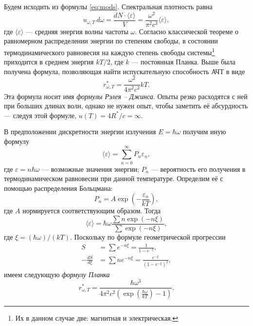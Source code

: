 Будем исходить из формулы \eqref{eq:mods}. Спектральная плотность равна
\[
  u_{\omega, T}\,d\omega = \frac{dN\cdot\langle \varepsilon \rangle}{V} =
  \frac{\omega^2}{\pi^2 c^3}\langle \varepsilon \rangle,
\]
где $ \langle \varepsilon \rangle $ --- средняя энергия волны частоты $ \omega
$. Согласно классической теореме о равномерном распределении энергии по степеням
свободы, в состоянии термодинамического равновесия на каждую степень свободы
системы\footnote{Их в данном случае две: магнитная и электрическая.} приходится
в среднем энергия $ kT/2 $, где $ k $ --- постоянная Планка. Выше была получена
формула, позволяющая найти испускательную способность АЧТ в виде 
\[
  r^\ast_{\omega, T} = \frac{\omega^2}{4\pi^2 c^2}kT.
\]
Эта формула носит имя \emph{формулы Рэлея -- Джинса}. Опыты резко расходятся с ней
при больших длинах волн, однако не нужен опыт, чтобы заметить её абсурдность ---
следуя этой формуле, $ u(T) = 4R^\ast/c = \infty $.

В предположении дискретности энергии излучения $ E = \hbar \omega $ получим иную
формулу 
\[
  \langle \varepsilon \rangle = \sum_{n=0}^\infty P_n\varepsilon_n,
\]
где $ \varepsilon = n\hbar\omega $ --- возможные значения энергии; $ P_n $ ---
вероятность его получения в термодинамическом равновесии при данной температуре.
Определим её с помощью распределения Больцмана: 
\[
    P_n = A\exp \left( - \frac{\varepsilon_n}{kT} \right),
\]
где $ A $ нормируется соответствующим образом. Тогда 
\[
  \langle\varepsilon\rangle = \hbar \omega \frac{\sum n \exp(-n\xi)}{\sum
  \exp(-n\xi)},
\]
где $ \xi = (\hbar\omega)/(kT) $.
Поскольку по формуле геометрической прогрессии 
\begin{align*}
  S &= \sum e^{-n\xi} = \frac{1}{1 - e^{-\xi}},\\
  -\frac{dS}{d\xi} &= \sum ne^{-n\xi}=\frac{e^{-\xi}}{(1-e^{-\xi})^2},
\end{align*}
имеем следующую \emph{формулу Планка} 
\[
  r^\ast_{\omega, T} =
\frac{\hbar\omega^3}{4\pi^2c^2(\exp\left(\frac{\hbar\omega}{kT}\right)-1)}.
\]

